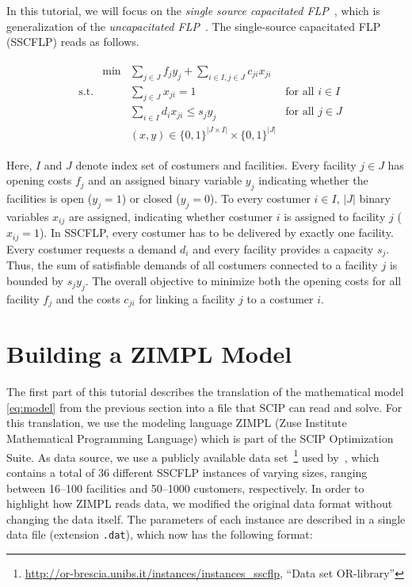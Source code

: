 \documentclass[a4paper,10pt]{article}
\begin{document}
In this tutorial, we will focus on the \emph{single source capacitated FLP}~\cite{daskin1993new},
which is generalization of the \emph{uncapacitated FLP}~\cite{daskin1993toward}.
The single-source capacitated FLP (SSCFLP) reads as follows.

\begin{align}
%
\begin{aligned}
&           & \min & \sum\limits_{j \in J} f_{j} y_{j} + \sum\limits_{i\in I, j\in J} c_{ji} x_{ji} & \\
&\text{s.t.}&& \sum\limits_{j \in J} x_{ji} = 1 & \text{for all $i \in I$}\\
&           && \sum\limits_{i \in I} d_{i} x_{ji} \leq s_{j} y_{j} & \text{for all $j \in J$}\\
&           && (x,y) \in \{0,1\}^{|J \times I|} \times \{0,1\}^{|J|} &
\end{aligned}
\tag{SSCFLP}\label{eq:model}
\end{align}

Here, $I$ and $J$ denote index set of costumers and facilities.
Every facility $j \in J$ has opening costs $f_j$ and an assigned binary variable $y_j$
indicating whether the facilities is open ($y_j = 1$) or closed ($y_j = 0$).
To every costumer $i \in I$, $\vert J \vert$ binary variables $x_{ij}$ are assigned,
indicating whether costumer $i$ is assigned to facility $j$ ($x_{ij} = 1$).
In SSCFLP, every costumer has to be delivered by exactly one facility.
Every costumer requests a demand $d_i$ and every facility provides a capacity $s_j$.
Thus, the sum of satisfiable demands of all costumers connected to a facility $j$ is bounded by $s_jy_j$.
The overall objective to minimize both the opening costs for all facility $f_j$
and the costs $c_{ji}$ for linking a facility $j$ to a costumer $i$.

\section{Building a ZIMPL Model}

The first part of this tutorial describes the translation of the mathematical model \eqref{eq:model} from the previous section into a file that SCIP can read and solve.
%
For this translation, we use the modeling language ZIMPL (Zuse Institute Mathematical Programming Language) which is part of the SCIP Optimization Suite.
%
As data source, we use a publicly available data set~\footnote{\url{http://or-brescia.unibs.it/instances/instances_sscflp}, ``Data set OR-library''} used by~\cite{Guastaroba14},
which contains a total of 36 different SSCFLP instances of varying sizes, ranging between 16--100 facilities and 50--1000 customers, respectively.
%
In order to highlight how ZIMPL reads data, we modified the original data format without changing the data itself.
%
The parameters of each instance are described in a single data file (extension \texttt{.dat}), which now has the following format:
\end{document}
